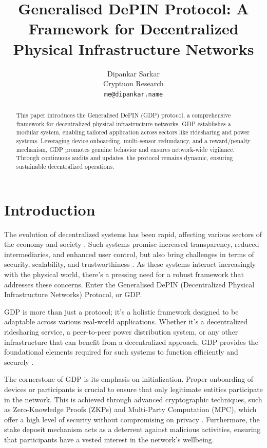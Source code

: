 \documentclass{article}
\title{Generalised DePIN Protocol: A Framework for Decentralized Physical Infrastructure Networks}
\author{Dipankar Sarkar \\
  Cryptuon Research \\
  \texttt{me@dipankar.name} \\
}
\begin{document}
\maketitle

\begin{abstract}
This paper introduces the Generalised DePIN (GDP) protocol, a comprehensive framework for decentralized physical infrastructure networks. GDP establishes a modular system, enabling tailored application across sectors like ridesharing and power systems. Leveraging device onboarding, multi-sensor redundancy, and a reward/penalty mechanism, GDP promotes genuine behavior and ensures network-wide vigilance. Through continuous audits and updates, the protocol remains dynamic, ensuring sustainable decentralized operations.
\end{abstract}

\section{Introduction}

The evolution of decentralized systems has been rapid, affecting various sectors of the economy and society \cite{nakamoto2008bitcoin} . Such systems promise increased transparency, reduced intermediaries, and enhanced user control, but also bring challenges in terms of security, scalability, and trustworthiness \cite{buterin2015ethereum}. As these systems interact increasingly with the physical world, there's a pressing need for a robust framework that addresses these concerns. Enter the Generalised DePIN (Decentralized Physical Infrastructure Networks) Protocol, or GDP.

GDP is more than just a protocol; it's a holistic framework designed to be adaptable across various real-world applications. Whether it's a decentralized ridesharing service, a peer-to-peer power distribution system, or any other infrastructure that can benefit from a decentralized approach, GDP provides the foundational elements required for such systems to function efficiently and securely \cite{tapscott2016blockchain}.

The cornerstone of GDP is its emphasis on initialization. Proper onboarding of devices or participants is crucial to ensure that only legitimate entities participate in the network. This is achieved through advanced cryptographic techniques, such as Zero-Knowledge Proofs (ZKPs) and Multi-Party Computation (MPC), which offer a high level of security without compromising on privacy \cite{bensasson2013snarks}. Furthermore, the stake deposit mechanism acts as a deterrent against malicious activities, ensuring that participants have a vested interest in the network's wellbeing.
\end{document}
